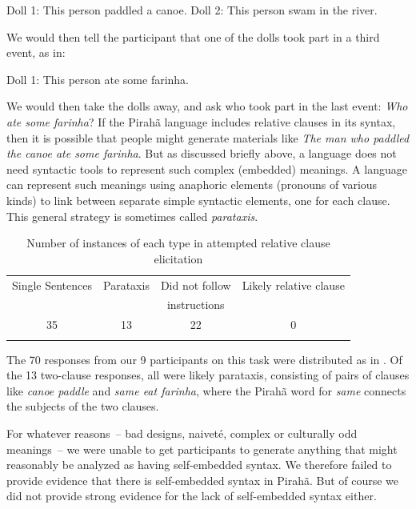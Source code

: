 \documentclass{article}
\begin{document}
\eal
\label{piraha_rcs}
\ex \label{piraha_rcs1} Doll 1: This person paddled a canoe.
\ex \label{piraha_rcs2} Doll 2: This person swam in the river.
\zl

We would then tell the participant that one of the dolls took part in a third event, as in:

\ea
\label{piraha_rcs3}
Doll 1: This person ate some farinha.
\z

We would then take the dolls away, and ask who took part in the last event: \textit{Who ate some farinha}?  If the Pirahã language includes relative clauses in its syntax, then it is possible that people might generate materials like \textit{The man who paddled the canoe ate some farinha}. But as discussed briefly above, a language does not need syntactic tools to represent such complex (embedded) meanings.  A language can represent such meanings using anaphoric elements (pronouns of various kinds) to link between separate simple syntactic elements, one for each clause.  This general strategy is sometimes called \textit{parataxis}.


\begin{table}
    \caption{Number of instances of each type in attempted relative clause elicitation}
    \label{gibson_table_1}
    \begin{tabular}{cccc}
    \lsptoprule
         Single Sentences & Parataxis & Did not follow  & Likely relative clause  \\
                          &           &  instructions   & \\\midrule
         35 & 13 & 22 & 0 \\
    \lspbottomrule
    \end{tabular}
\end{table}

The 70 responses from our 9 participants on this task were distributed as in .  Of the 13 two-clause responses, all were likely parataxis, consisting of pairs of clauses like \textit{canoe paddle} and \textit{same eat farinha}, where the Pirahã word for \textit{same} connects the subjects of the two clauses.

For whatever reasons~– bad designs, naiveté, complex or culturally odd meanings~– we were unable to get participants to generate anything that might reasonably be analyzed as having self-embedded syntax. We therefore failed to provide evidence that there is self-embedded syntax in Pirahã.  But of course we did not provide strong evidence for the lack of self-embedded syntax either.
\end{document}
